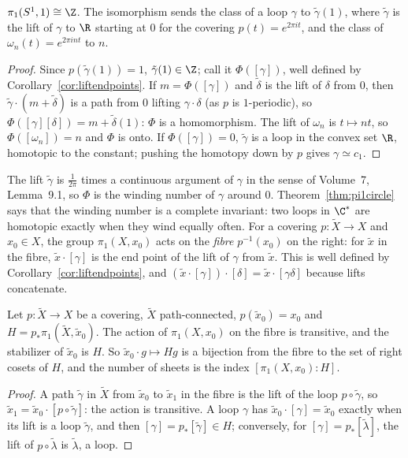 \begin{theorem}\label{thm:pi1circle}
$\pi_1(S^1,1)\cong\Z$. The isomorphism sends the class of a loop $\gamma$ to $\tilde\gamma(1)$, where $\tilde\gamma$ is the lift of $\gamma$ to $\R$ starting at $0$ for the covering $p(t)=e^{2\pi it}$, and the
class of $\omega_n(t)=e^{2\pi int}$ to $n$.
\end{theorem}

\begin{proof}
Since $p(\tilde\gamma(1))=1$, $\tilde\gamma(1)\in\Z$; call it $\Phi([\gamma])$, well defined by Corollary~\ref{cor:liftendpoints}. If $m=\Phi([\gamma])$ and $\tilde\delta$ is the lift of $\delta$ from $0$, then
$\tilde\gamma\cdot(m+\tilde\delta)$ is a path from $0$ lifting $\gamma\cdot\delta$ (as $p$ is $1$-periodic), so $\Phi([\gamma][\delta])=m+\tilde\delta(1)$: $\Phi$ is a homomorphism. The lift of $\omega_n$ is $t\mapsto nt$,
so $\Phi([\omega_n])=n$ and $\Phi$ is onto. If $\Phi([\gamma])=0$, $\tilde\gamma$ is a loop in the convex set $\R$, homotopic to the constant; pushing the homotopy down by $p$ gives
$\gamma\simeq c_1$.
\end{proof}

The lift $\tilde\gamma$ is $\frac1{2\pi}$ times a continuous argument of $\gamma$ in the sense of Volume~7, Lemma~9.1, so $\Phi$ is the winding number of $\gamma$ around $0$. Theorem~\ref{thm:pi1circle}
says that the winding number is a complete invariant: two loops in $\C^*$ are homotopic exactly when they wind equally often. For a covering
$p\colon\tilde X\to X$ and $x_0\in X$, the group $\pi_1(X,x_0)$ acts on the \emph{fibre} $p^{-1}(x_0)$ on the right: for $\tilde x$ in the fibre, $\tilde x\cdot[\gamma]$ is the end point of the lift of $\gamma$
from $\tilde x$. This is well defined by Corollary~\ref{cor:liftendpoints}, and $(\tilde x\cdot[\gamma])\cdot[\delta]=\tilde x\cdot[\gamma\delta]$ because lifts concatenate.

\begin{proposition}\label{prop:fibre}
Let $p\colon\tilde X\to X$ be a covering, $\tilde X$ path-connected, $p(\tilde x_0)=x_0$ and $H=p_*\pi_1(\tilde X,\tilde x_0)$. The action of $\pi_1(X,x_0)$ on the fibre is transitive, and the stabilizer
of $\tilde x_0$ is $H$. So $\tilde x_0\cdot g\mapsto Hg$ is a bijection from the fibre to the set of right cosets of $H$, and the number of sheets is the index $[\pi_1(X,x_0):H]$.
\end{proposition}

\begin{proof}
A path $\tilde\gamma$ in $\tilde X$ from $\tilde x_0$ to $\tilde x_1$ in the fibre is the lift of the loop $p\circ\tilde\gamma$, so $\tilde x_1=\tilde x_0\cdot[p\circ\tilde\gamma]$: the action is transitive. A loop $\gamma$
has $\tilde x_0\cdot[\gamma]=\tilde x_0$ exactly when its lift is a loop $\tilde\gamma$, and then $[\gamma]=p_*[\tilde\gamma]\in H$; conversely, for $[\gamma]=p_*[\tilde\lambda]$, the lift of $p\circ\tilde\lambda$ is $\tilde\lambda$, a loop.
\end{proof}

